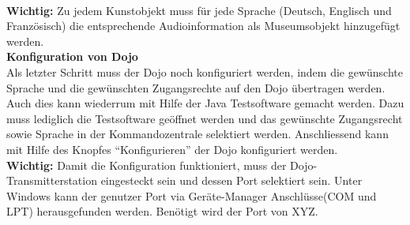 \\[4mm]
\textbf{Wichtig:} Zu jedem Kunstobjekt muss für jede Sprache (Deutsch, Englisch und Französisch) die entsprechende Audioinformation als Museumsobjekt hinzugefügt werden.
\\[4mm]
\textbf{Konfiguration von Dojo}
\\[4mm]
Als letzter Schritt muss der Dojo noch konfiguriert werden, indem die gewünschte Sprache und die gewünschten Zugangsrechte auf den Dojo übertragen werden. Auch dies kann wiederrum mit Hilfe der Java Testsoftware gemacht werden. Dazu muss lediglich die Testsoftware geöffnet werden und das gewünschte Zugangsrecht sowie Sprache in der Kommandozentrale selektiert werden. Anschliessend kann mit Hilfe des Knopfes ``Konfigurieren'' der Dojo konfiguriert werden.
\\[4mm]
\textbf{Wichtig:} Damit die Konfiguration funktioniert, muss der Dojo-Transmitterstation eingesteckt sein und dessen Port selektiert sein. Unter Windows kann der genutzer Port via Geräte-Manager Anschlüsse(COM und LPT) herausgefunden werden. Benötigt wird der Port von XYZ.